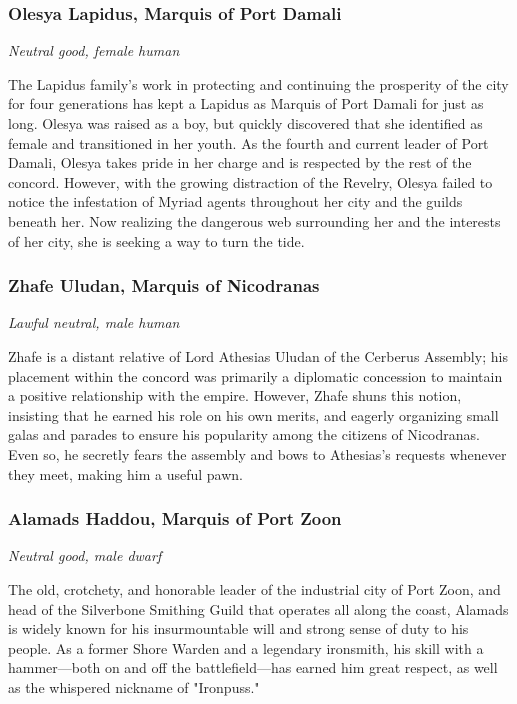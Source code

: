 \documentclass[10pt,a4paper,twoside,bg=print,twocolumn,openany,nodeprecatedcode]{dndbook}
\begin{document}
\subsubsection{Olesya Lapidus, Marquis of Port Damali}
\textit{Neutral good, female human}

The Lapidus family's work in protecting and continuing the prosperity of the city for four generations has kept a Lapidus as Marquis of Port Damali for just as long. Olesya was raised as a boy, but quickly discovered that she identified as female and transitioned in her youth. As the fourth and current leader of Port Damali, Olesya takes pride in her charge and is respected by the rest of the concord. However, with the growing distraction of the Revelry, Olesya failed to notice the infestation of Myriad agents throughout her city and the guilds beneath her. Now realizing the dangerous web surrounding her and the interests of her city, she is seeking a way to turn the tide.

\subsubsection{Zhafe Uludan, Marquis of Nicodranas}
\textit{Lawful neutral, male human}

Zhafe is a distant relative of Lord Athesias Uludan of the Cerberus Assembly; his placement within the concord was primarily a diplomatic concession to maintain a positive relationship with the empire. However, Zhafe shuns this notion, insisting that he earned his role on his own merits, and eagerly organizing small galas and parades to ensure his popularity among the citizens of Nicodranas. Even so, he secretly fears the assembly and bows to Athesias's requests whenever they meet, making him a useful pawn.

\subsubsection{Alamads Haddou, Marquis of Port Zoon}
\textit{Neutral good, male dwarf}

The old, crotchety, and honorable leader of the industrial city of Port Zoon, and head of the Silverbone Smithing Guild that operates all along the coast, Alamads is widely known for his insurmountable will and strong sense of duty to his people. As a former Shore Warden and a legendary ironsmith, his skill with a hammer—both on and off the battlefield—has earned him great respect, as well as the whispered nickname of "Ironpuss."
\end{document}
